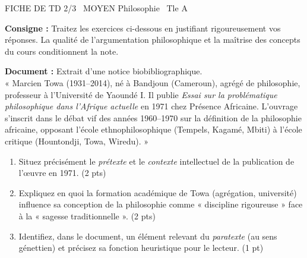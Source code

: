 \documentclass[11pt]{article}
\begin{document}
\begin{tcolorbox}[enhanced,colback=popink,colframe=popink,arc=10pt,boxrule=0pt,left=12pt,right=12pt,top=9pt,bottom=9pt]
{\color{white}\popxbold\small FICHE DE TD 2/3 \textbullet\ MOYEN \hfill Philosophie \textbullet\ Tle A\par}
\end{tcolorbox}
\vspace{4pt}
\noindent \textbf{Consigne :} Traitez les exercices ci-dessous en justifiant rigoureusement vos réponses. La qualité de l'argumentation philosophique et la maîtrise des concepts du cours conditionnent la note.

\begin{exercice}
\textbf{Document :} Extrait d'une notice biobibliographique.\\
« Marcien Towa (1931--2014), né à Bandjoun (Cameroun), agrégé de philosophie, professeur à l'Université de Yaoundé I. Il publie \textit{Essai sur la problématique philosophique dans l'Afrique actuelle} en 1971 chez Présence Africaine. L'ouvrage s'inscrit dans le débat vif des années 1960--1970 sur la définition de la philosophie africaine, opposant l'école ethnophilosophique (Tempels, Kagamé, Mbiti) à l'école critique (Hountondji, Towa, Wiredu). »
\begin{enumerate}
    \item Situez précisément le \textit{prétexte} et le \textit{contexte} intellectuel de la publication de l'œuvre en 1971. (2 pts)
    \item Expliquez en quoi la formation académique de Towa (agrégation, université) influence sa conception de la philosophie comme « discipline rigoureuse » face à la « sagesse traditionnelle ». (2 pts)
    \item Identifiez, dans le document, un élément relevant du \textit{paratexte} (au sens génettien) et précisez sa fonction heuristique pour le lecteur. (1 pt)
\end{enumerate}
\end{exercice}
\end{document}
